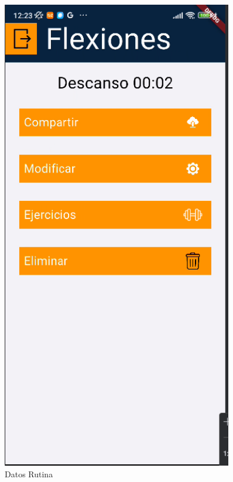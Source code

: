 \begin{figure}[H]
   \centering
   \begin{minipage}{0.45\textwidth}
      \centering
      \includegraphics[width=0.9\textwidth]{pantallas/DatosRutina.png}
      \caption{Datos Rutina}
      \label{fig:DatosRutina}
   \end{minipage}%
   \hspace{0.5cm}
   \begin{minipage}{0.45\textwidth}

\end{minipage}
\end{figure}
